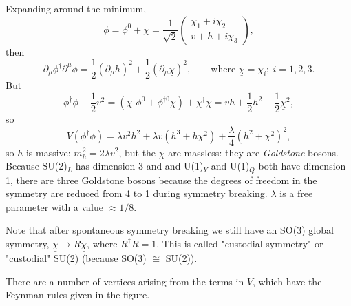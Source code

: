 \documentclass[a4paper,12pt]{article}
\begin{document}
Expanding around the minimum,
\[\phi = \phi^0 + \chi = \frac{1}{\sqrt{2}} \left( \begin{array}{cc}
\chi_1 + i \chi_2  \\
v + h + i \chi_3  \end{array} \right), \]
then 
\begin{equation}
\partial_\mu \phi^\dagger \partial^\mu \phi = \frac{1}{2} (\partial_\mu h)^2 + \frac{1}{2} (\partial_\mu \underline{\chi})^2, \qquad \text{where } \underline{\chi} = \chi_i; \ i=1,2,3.
\end{equation}
But
\begin{equation}
\phi^\dagger \phi -\frac{1}{2}v^2 = (\chi^\dagger \phi^0 + \phi^{\dagger 0}\chi) + \chi^\dagger \chi = vh + \frac{1}{2}h^2 + \frac{1}{2}\underline{\chi}^2,
\end{equation}
so 
\begin{equation}
V(\phi^\dagger \phi) = \lambda v^2 h^2 + \lambda v (h^3 + h \underline{\chi}^2) + \frac{\lambda}{4}(h^2 + \underline{\chi}^2)^2,
\end{equation}
so $h$ is massive: $m_h^2 = 2 \lambda v^2$, but the $\chi$ are massless: they are \textit{Goldstone} bosons. Because SU(2)$_L$ has dimension 3 and and U(1)$_Y$ and U(1)$_Q$ both have dimension 1, there are three Goldstone bosons because the degrees of freedom in the symmetry are reduced from 4 to 1 during symmetry breaking. $\lambda$ is a free parameter with a value $\approx 1/8$. 

Note that after spontaneous symmetry breaking we still have an SO(3) global symmetry, $\underline{\chi} \to R \underline{\chi}$, where $R^\dagger R =1$. This is called "custodial symmetry" or "custodial" SU(2) (because SO(3) $\cong$ SU(2)).

There are a number of vertices arising from the terms in $V$, which have the Feynman rules given in the figure.
\begin{figure}[!h]
  \centering
  \hfill
\end{figure}
%
\end{document}
